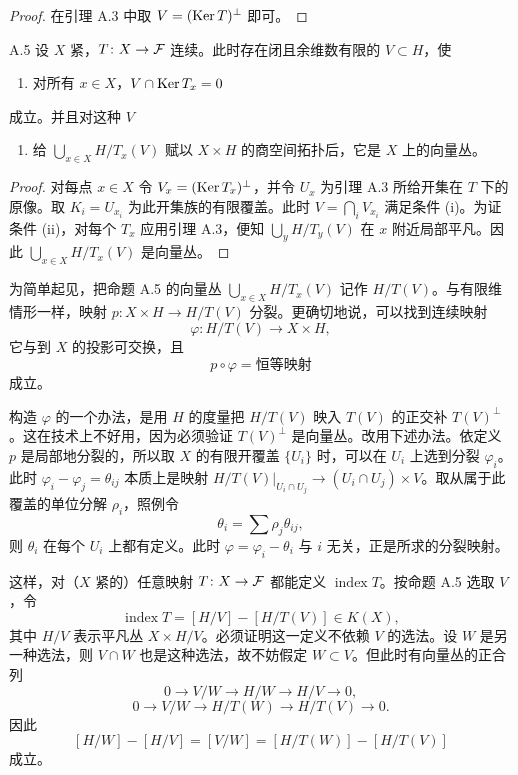 \begin{proof}
  在引理 A.3 中取 $V=(\operatorname{Ker} T)^\perp$ 即可。
\end{proof}

\begin{proposition*}{A.5}
  设 $X$ 紧，$T\colon X\to\mathcal{F}$ 连续。此时存在闭且余维数有限的 $V\subset H$，使
  \begin{enumerate}[label=(\roman*),leftmargin=2.2em,itemsep=1pt,topsep=2pt]
    \item 对所有 $x\in X$，$V\cap\operatorname{Ker} T_x=0$
  \end{enumerate}
  成立。并且对这种 $V$
  \begin{enumerate}[label=(\roman*),leftmargin=2.2em,itemsep=1pt,topsep=2pt,start=2]
    \item 给 $\bigcup_{x\in X}H/T_x(V)$ 赋以 $X\times H$ 的商空间拓扑后，它是 $X$ 上的向量丛。
  \end{enumerate}
\end{proposition*}
\begin{proof}
  对每点 $x\in X$ 令 $V_x=(\operatorname{Ker} T_x)^\perp$，并令 $U_x$ 为引理 A.3 所给开集在 $T$ 下的原像。取 $K_i=U_{x_i}$ 为此开集族的有限覆盖。此时 $V=\bigcap_i V_{x_i}$ 满足条件 (i)。为证条件 (ii)，对每个 $T_x$ 应用引理 A.3，便知 $\bigcup_y H/T_y(V)$ 在 $x$ 附近局部平凡。因此 $\bigcup_{x\in X}H/T_x(V)$ 是向量丛。
\end{proof}


为简单起见，把命题 A.5 的向量丛 $\bigcup_{x\in X}H/T_x(V)$ 记作 $H/T(V)$。与有限维情形一样，映射 $p\colon X\times H\to H/T(V)$ 分裂。更确切地说，可以找到连续映射
\[
  \varphi\colon H/T(V)\to X\times H,
\]
它与到 $X$ 的投影可交换，且
\[
  p\circ\varphi=\text{恒等映射}
\]
成立。

构造 $\varphi$ 的一个办法，是用 $H$ 的度量把 $H/T(V)$ 映入 $T(V)$ 的正交补 $T(V)^\perp$。这在技术上不好用，因为必须验证 $T(V)^\perp$ 是向量丛。改用下述办法。依定义 $p$ 是局部地分裂的，所以取 $X$ 的有限开覆盖 $\{U_i\}$ 时，可以在 $U_i$ 上选到分裂 $\varphi_i$。此时 $\varphi_i-\varphi_j=\theta_{ij}$ 本质上是映射 $H/T(V)|_{U_i\cap U_j}\to(U_i\cap U_j)\times V$。取从属于此覆盖的单位分解 $\rho_i$，照例令
\[
  \theta_i=\sum\rho_j\theta_{ij},
\]
则 $\theta_i$ 在每个 $U_i$ 上都有定义。此时 $\varphi=\varphi_i-\theta_i$ 与 $i$ 无关，正是所求的分裂映射。

这样，对（$X$ 紧的）任意映射 $T\colon X\to\mathcal{F}$ 都能定义 $\operatorname{index}T$。按命题 A.5 选取 $V$，令
\[
  \operatorname{index}T=[H/V]-[H/T(V)]\in K(X),
\]
其中 $H/V$ 表示平凡丛 $X\times H/V$。必须证明这一定义不依赖 $V$ 的选法。设 $W$ 是另一种选法，则 $V\cap W$ 也是这种选法，故不妨假定 $W\subset V$。但此时有向量丛的正合列
\[
  0\to V/W\to H/W\to H/V\to 0,
\]
\[
  0\to V/W\to H/T(W)\to H/T(V)\to 0.
\]
因此
\[
  [H/W]-[H/V]=[V/W]=[H/T(W)]-[H/T(V)]
\]
成立。


